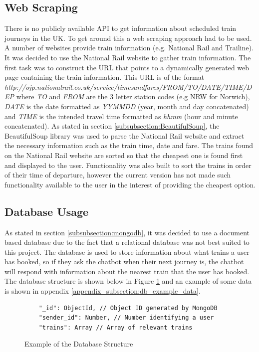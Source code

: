 \documentclass[12pt,a4paper]{article}
\begin{document}
    \subsection{Web Scraping}
    There is no publicly available API to get information about scheduled train journeys in the UK. To get around this a web scraping approach had to be used. A number of websites provide train information (e.g. National Rail and Trailine). It was decided to use the National Rail website to gather train information. The first task was to construct the URL that points to a dynamically generated web page containing the train information. This URL is of the format
    \emph{http://ojp.nationalrail.co.uk/service/timesandfares/FROM/TO/DATE/TIME/DEP} where \emph{TO} and \emph{FROM} are the 3 letter station codes (e.g NRW for Norwich), \emph{DATE} is the date formatted as \emph{YYMMDD} (year, month and day concatenated) and \emph{TIME} is the intended travel time formatted as \emph{hhmm} (hour and minute concatenated).
    As stated in section \ref{subsubsection:BeautifulSoup}, the BeautifulSoup library was used to parse the National Rail website and extract the necessary information such as the train time, date and fare. The trains found on the National Rail website are sorted so that the cheapest one is found first and displayed to the user. Functionality was also built to sort the trains in order of their time of departure, however the current version has not made such functionality available to the user in the interest of providing the cheapest option.
    
    \subsection{Database Usage}
    As stated in section \ref{subsubsection:mongodb}, it was decided to use a document based database due to the fact that a relational database was not best suited to this project. The database is used to store information about what trains a user has booked, so if they ask the chatbot when their next journey is, the chatbot will respond with information about the nearest train that the user has booked. The database structure is shown below in Figure \ref{fig:db_structure} and an example of some data is shown in appendix \ref{appendix_subsection:db_example_data}. \\
    
    \begin{figure}
    \begin{lstlisting}
    "_id": ObjectId, // Object ID generated by MongoDB
    "sender_id": Number, // Number identifying a user
    "trains": Array // Array of relevant trains
    \end{lstlisting}
    \caption{Example of the Database Structure}
    \label{fig:db_structure}
    \end{figure}
    
\end{document}
